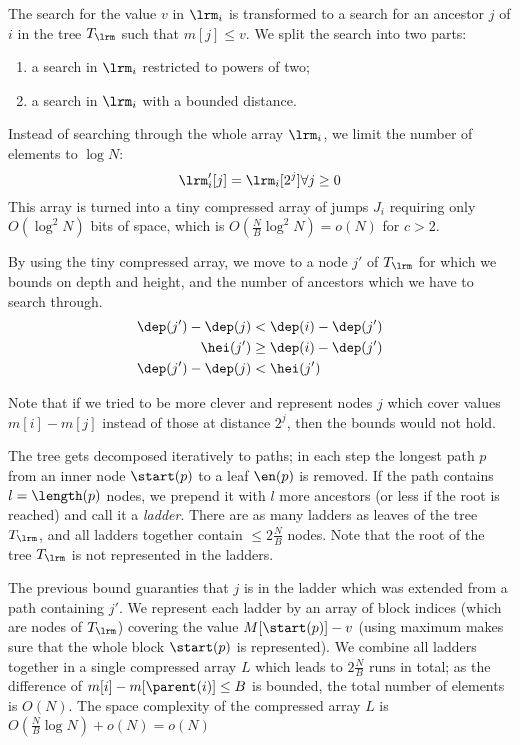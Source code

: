 The search for the value $v$ in $\lrm_i$ is transformed to a search for an ancestor $j$ of $i$ in the tree $T_{\lrm}$ such that $m[j] \le v$.
We split the search into two parts:
\begin{enumerate}
	\item a search in $\lrm_i$ restricted to powers of two;
	\item a search in $\lrm_i$ with a bounded distance.
\end{enumerate}

\bigbreak

Instead of searching through the whole array $\lrm_i$, we limit the number of elements to $\log N$:
$$ \lrm'_i[j] = \lrm_i[2^j] \forall j \ge 0$$
This array is turned into a tiny compressed array of jumps $J_i$ requiring only $O(\log^2 N)$ bits of space, which is $O(\frac{N}{B} \log^2 N) = o(N)$ for $c > 2$.

By using the tiny compressed array, we move to a node $j'$ of $T_{\lrm}$ for which we bounds on depth and height, and the number of ancestors which we have to search through.
\begin{align*}
	\dep(j') - \dep(j) &< \dep(i) - \dep(j') \\
	\hei(j') &\ge \dep(i) - \dep(j') \\
	\dep(j') - \dep(j) &< \hei(j')
\end{align*}

Note that if we tried to be more clever and represent nodes $j$ which cover values $m[i] - m[j]$ instead of those at distance $2^j$, then the bounds would not hold.

\bigbreak

The tree gets decomposed iteratively to paths; in each step the longest path $p$ from an inner node $\start(p)$ to a leaf $\en(p)$ is removed.
If the path contains $l = \length(p)$ nodes, we prepend it with $l$ more ancestors (or less if the root is reached) and call it a \emph{ladder}.
There are as many ladders as leaves of the tree $T_{\lrm}$, and all ladders together contain $\le 2 \frac{N}{B}$ nodes.
Note that the root of the tree $T_{\lrm}$ is not represented in the ladders.

The previous bound guaranties that $j$ is in the ladder which was extended from a path containing $j'$.
We represent each ladder by an array of block indices (which are nodes of $T_{\lrm}$) covering the value $M[\start(p)] - v$ (using maximum makes sure that the whole block $\start(p)$ is represented).
We combine all ladders together in a single compressed array $L$ which leads to $2 \frac{N}{B}$ runs in total; as the difference of $m[i] - m[\parent(i)] \le B$ is bounded, the total number of elements is $O(N)$.
The space complexity of the compressed array $L$ is $O(\frac{N}{B} \log N) + o(N) = o(N)$

